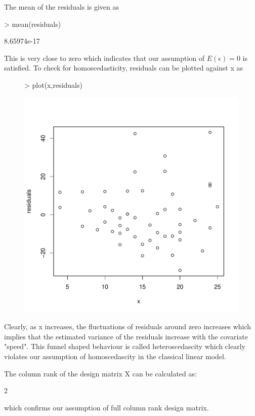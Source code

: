 \documentclass[12pt]{article}
\begin{document}
The mean of the residuals is given as
\begin{Schunk}
\begin{Sinput}
> mean(residuals)
\end{Sinput}
\begin{Soutput}
[1] 8.65974e-17
\end{Soutput}
\end{Schunk}
This is very close to zero which indicates that our assumption of $E(\epsilon)=0$ is satisfied.
To check for homoscedasticity, residuals can be plotted against x as
\begin{figure}[H]
\begin{Schunk}
\begin{Sinput}
> plot(x,residuals)
\end{Sinput}
\end{Schunk}
\includegraphics{HW3-009}
\end{figure}
Clearly, as x increases, the fluctuations of residuals around zero increases which implies that the estimated variance of the residuals increase with the covariate "speed". This funnel shaped behaviour is called heteroscedascity which clearly violates our assumption of homoscedascity in the classical linear model. 

The column rank of the design matrix X can be calculated as:
\begin{Schunk}
\begin{Soutput}
[1] 2
\end{Soutput}
\end{Schunk}
which confirms our assumption of full column rank design matrix.
\end{document}

